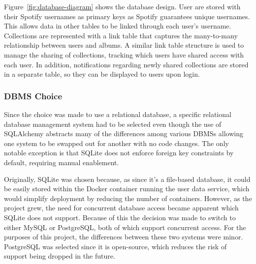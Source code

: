 Figure~\ref{fig:database-diagram} shows the database design. User are stored with their Spotify usernames as primary keys as Spotify guarantees unique usernames. This allows data in other tables to be linked through each user’s username. Collections are represented with a link table that captures the many-to-many relationship between users and albums. A similar link table structure is used to manage the sharing of collections, tracking which users have shared access with each user. In addition, notifications regarding newly shared collections are stored in a separate table, so they can be displayed to users upon login.

\subsubsection{DBMS Choice}
Since the choice was made to use a relational database, a specific relational database management system had to be selected even though the use of SQLAlchemy abstracts many of the differences among various DBMSs allowing one system to be swapped out for another with no code changes. The only notable exception is that SQLite does not enforce foreign key constraints by default, requiring manual enablement.

Originally, SQLite was chosen because, as since it's a file-based database, it could be easily stored within the Docker container running the user data service, which would simplify deployment by reducing the number of containers. However, as the project grew, the need for concurrent database access became apparent which SQLite does not support. Because of this the decision was made to switch to either MySQL or PostgreSQL, both of which support concurrent access. For the purposes of this project, the differences between these two systems were minor. PostgreSQL was selected since it is open-source, which reduces the risk of support being dropped in the future.

